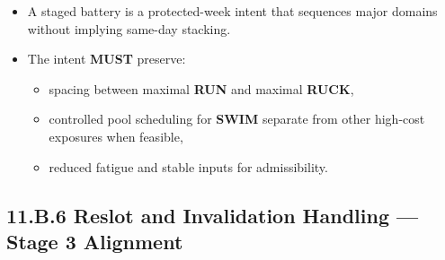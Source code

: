 \documentclass[10pt]{article}
\begin{document}
\begin{itemize}
\item A staged battery is a protected-week intent that sequences major domains without implying same-day stacking.
\item The intent \textbf{MUST} preserve:
\begin{itemize}
\item spacing between maximal \textbf{RUN} and maximal \textbf{RUCK},
\item controlled pool scheduling for \textbf{SWIM} separate from other high-cost exposures when feasible,
\item reduced fatigue and stable inputs for admissibility.
\end{itemize}
\end{itemize}

\newpage
\subsection*{11.B.6 Reslot and Invalidation Handling — Stage 3 Alignment}
{}
\end{document}
